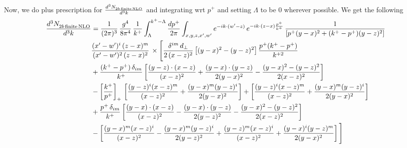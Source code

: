 \documentclass[9pt]{article}
\numberwithin{equation}{section}
\begin{document}
Now, we do plus prescription for $\frac{d^{3}N_{2b\,\rm finite\, NLO}^{\rm}}{d^{3}k}$ and integrating wrt $p^{+}$ and setting $\Lambda$ to be $0$ wherever possible. We get the following
\begin{align}
    \frac{d^{3}N_{2b\,\rm finite\, NLO}^{\rm}}{d^{3}k} & = \frac{1}{(2\pi)^{3}}\,\frac{g^{4}}{8\pi^{4}}\,\frac{1}{k^{+}}\int_{\Lambda}^{k^{+}-\Lambda}\frac{dp^{+}}{2\pi}\int_{x,y,z,x',w'}e^{-ik\cdot(w'-z)}\,e^{-ik\cdot(z-x)\frac{p^{+}}{k^{+}}}\,\frac{1}{\left[p^{+}(y-x)^{2}+(k^{+}-p^{+})(y-z)^{2}\right]}\notag \\ & \frac{(x'-w')^{i}\,(z-x)^{m}}{(x'-w')^{2}\,(z-x)^{2}}\,\times\Bigg[\frac{\delta^{im}\,d_{\perp}}{2\,(x-z)^{2}}\left[(y-x)^{2}-(y-z)^{2}\right]\frac{p^{+}(k^{+}-p^{+})}{k^{+2}}
\notag \\ & +\frac{(k^{+}-p^{+})\,\delta_{im}}{k^{+}}\left[\frac{(y-z)\cdot(x-z)}{(x-z)^{2}}+\frac{(y-x)\cdot(y-z)}{2(y-x)^{2}}-\frac{(y-x)^{2}-(y-z)^{2}}{2(x-z)^{2}}\right]\notag\\
&-\left[\frac{k^{+}}{p^{+}}\right]_{+}\,\left[\frac{(y-z)^{i}(x-z)^{m}}{(x-z)^{2}}+\frac{(y-x)^{m}(y-z)^{i}}{2(y-x)^{2}}\right]+\left[\frac{(y-z)^{i}(x-z)^{m}}{(x-z)^{2}}+\frac{(y-x)^{m}(y-z)^{i}}{2(y-x)^{2}}\right]\notag\\
&+\frac{p^{+}\,\delta_{im}}{k^{+}}\left[\frac{(y-x)\cdot(x-z)}{(x-z)^{2}}-\frac{(y-x)\cdot(y-z)}{2(y-z)^{2}}-\frac{(y-x)^{2}-(y-z)^{2}}{2(x-z)^{2}}\right]\notag\\
&-\left[\frac{(y-x)^{m}(x-z)^{i}}{(x-z)^{2}}-\frac{(y-x)^{m}(y-z)^{i}}{2(y-z)^{2}}+\frac{(y-z)^{m}(x-z)^{i}}{(x-z)^{2}}+\frac{(y-x)^{i}(y-z)^{m}}{2(y-x)^{2}}\right]\Bigg]\notag\\

\end{align}
\end{document}
